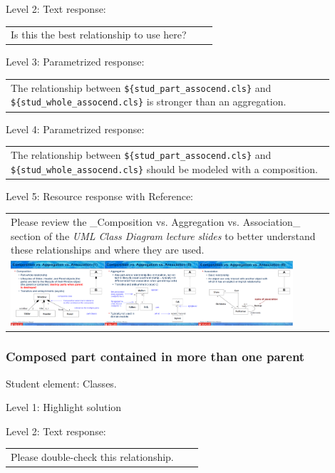 \noindent Level 2: Text response: \medskip

\begin{tabular}{|p{0.9\linewidth}}
Is this the best relationship to use here?
\end{tabular} \medskip

\noindent Level 3: Parametrized response: \medskip

\begin{tabular}{|p{0.9\linewidth}}
The relationship between \verb|${stud_part_assocend.cls}| and \verb|${stud_whole_assocend.cls}| is stronger than an aggregation.
\end{tabular} \medskip

\noindent Level 4: Parametrized response: \medskip

\begin{tabular}{|p{0.9\linewidth}}
The relationship between \verb|${stud_part_assocend.cls}| and \verb|${stud_whole_assocend.cls}| should be modeled with a composition.
\end{tabular} \medskip

\noindent Level 5: Resource response with Reference: \medskip

\begin{tabular}{|p{0.9\linewidth}}
Please review the _Composition vs. Aggregation vs. Association_ section of 
the \textit{UML Class Diagram lecture slides} to 
better understand these relationships and where they are used.

\\
\includegraphics[width=0.9\textwidth]{images/composition_aggregation_association.png}
\end{tabular} \medskip


\subsubsection{Composed part contained in more than one parent}

Student element: Classes.  \medskip

\noindent Level 1: Highlight solution  \medskip

\noindent Level 2: Text response: \medskip

\begin{tabular}{|p{0.9\linewidth}}
Please double-check this relationship.
\end{tabular} \medskip

